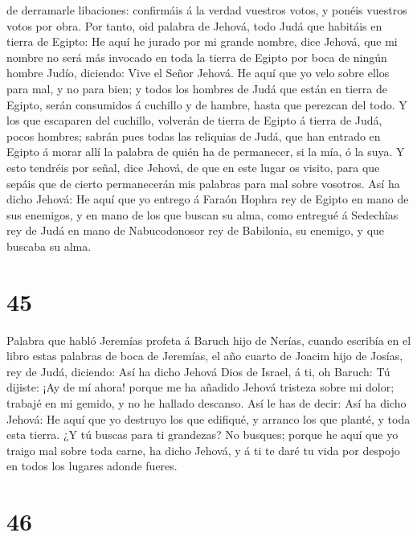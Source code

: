 de derramarle libaciones: confirmáis á la verdad vuestros votos, y
ponéis vuestros votos por obra.  Por tanto, oid palabra
de Jehová, todo Judá que habitáis en tierra de Egipto: He aquí he jurado
por mi grande nombre, dice Jehová, que mi nombre no será más invocado en
toda la tierra de Egipto por boca de ningún hombre Judío, diciendo: Vive
el Señor Jehová.  He aquí que yo velo sobre ellos para
mal, y no para bien; y todos los hombres de Judá que están en tierra de
Egipto, serán consumidos á cuchillo y de hambre, hasta que perezcan del
todo.  Y los que escaparen del cuchillo, volverán de
tierra de Egipto á tierra de Judá, pocos hombres; sabrán pues todas las
reliquias de Judá, que han entrado en Egipto á morar allí la palabra de
quién ha de permanecer, si la mía, ó la suya.  Y esto
tendréis por señal, dice Jehová, de que en este lugar os visito, para
que sepáis que de cierto permanecerán mis palabras para mal sobre
vosotros.  Así ha dicho Jehová: He aquí que yo entrego á
Faraón Hophra rey de Egipto en mano de sus enemigos, y en mano de los
que buscan su alma, como entregué á Sedechîas rey de Judá en mano de
Nabucodonosor rey de Babilonia, su enemigo, y que buscaba su alma.

\hypertarget{section-44}{%
\section{45}\label{section-44}}

 Palabra que habló Jeremías profeta á Baruch hijo de
Nerías, cuando escribía en el libro estas palabras de boca de Jeremías,
el año cuarto de Joacim hijo de Josías, rey de Judá, diciendo:
 Así ha dicho Jehová Dios de Israel, á ti, oh Baruch:
 Tú dijiste: ¡Ay de mí ahora! porque me ha añadido Jehová
tristeza sobre mi dolor; trabajé en mi gemido, y no he hallado descanso.
 Así le has de decir: Así ha dicho Jehová: He aquí que yo
destruyo los que edifiqué, y arranco los que planté, y toda esta tierra.
 ¿Y tú buscas para ti grandezas? No busques; porque he
aquí que yo traigo mal sobre toda carne, ha dicho Jehová, y á ti te daré
tu vida por despojo en todos los lugares adonde fueres.

\hypertarget{section-45}{%
\section{46}\label{section-45}}

